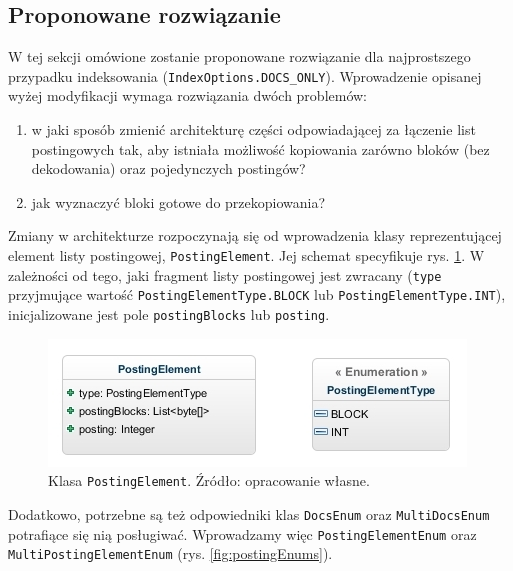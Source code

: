 \subsection{Proponowane rozwiązanie}
\label{sec:solution}

W tej sekcji omówione zostanie proponowane rozwiązanie dla najprostszego przypadku indeksowania (\texttt{IndexOptions.DOCS\_ONLY}). Wprowadzenie opisanej wyżej modyfikacji wymaga rozwiązania dwóch problemów:
\begin{enumerate}
 \item w jaki sposób zmienić architekturę części odpowiadającej za łączenie list postingowych tak, aby istniała możliwość kopiowania zarówno bloków (bez dekodowania) oraz pojedynczych postingów?
 \item jak wyznaczyć bloki gotowe do przekopiowania?
\end{enumerate}

Zmiany w architekturze rozpoczynają się od wprowadzenia klasy reprezentującej element listy postingowej, \texttt{PostingElement}. Jej schemat specyfikuje rys. \ref{fig:postingElement}. W zależności od tego, jaki fragment listy postingowej jest zwracany (\texttt{type} przyjmujące wartość \texttt{PostingElementType.BLOCK} lub \texttt{PostingElementType.INT}), inicjalizowane jest pole \texttt{postingBlocks} lub \texttt{posting}.

\begin{figure}[here]
 \includegraphics[scale=0.7]{pictures/PostingElement.jpg}
 \caption{Klasa \texttt{PostingElement}. Źródło: opracowanie własne. \label{fig:postingElement}}
\end{figure}

Dodatkowo, potrzebne są też odpowiedniki klas \texttt{DocsEnum} oraz \texttt{MultiDocsEnum} potrafiące się nią posługiwać. Wprowadzamy więc \texttt{PostingElementEnum} oraz \texttt{MultiPostingElementEnum} (rys. \ref{fig:postingEnums}).

